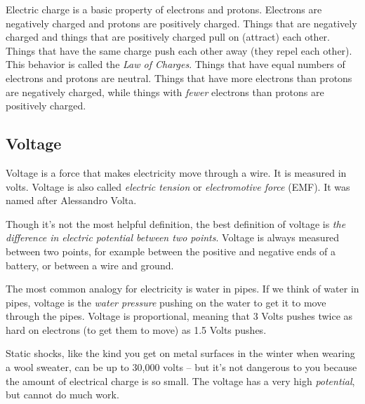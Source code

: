 Electric charge is a basic property of electrons and protons. Electrons are negatively charged and protons are positively charged. Things that are negatively charged and things that are positively charged pull on (attract) each other. Things that have the same charge push each other away (they repel each other). This behavior is called the \emph{Law of Charges}. Things that have equal numbers of electrons and protons are neutral. Things that have more electrons than protons are negatively charged, while things with \emph{fewer} electrons than protons are positively charged.



\subsection*{Voltage}

Voltage is a force that makes electricity move through a wire. It is measured in volts. Voltage is also called \emph{electric tension} or \emph{electromotive force} (EMF). It was named after Alessandro Volta.

Though it's not the most helpful definition, the best definition of voltage is \emph{the difference in electric potential between two points}. Voltage is always measured between two points, for example between the positive and negative ends of a battery, or between a wire and ground.

The most common analogy for electricity is water in pipes. If we think of water in pipes, voltage is the \emph{water pressure} pushing on the water to get it to move through the pipes. Voltage is proportional, meaning that 3 Volts pushes twice as hard on electrons (to get them to move) as 1.5 Volts pushes.

Static shocks, like the kind you get on metal surfaces in the winter when wearing a wool sweater, can be up to 30,000 volts -- but it's not dangerous to you because the amount of electrical charge is so small. The voltage has a very high \emph{potential}, but cannot do much work.

